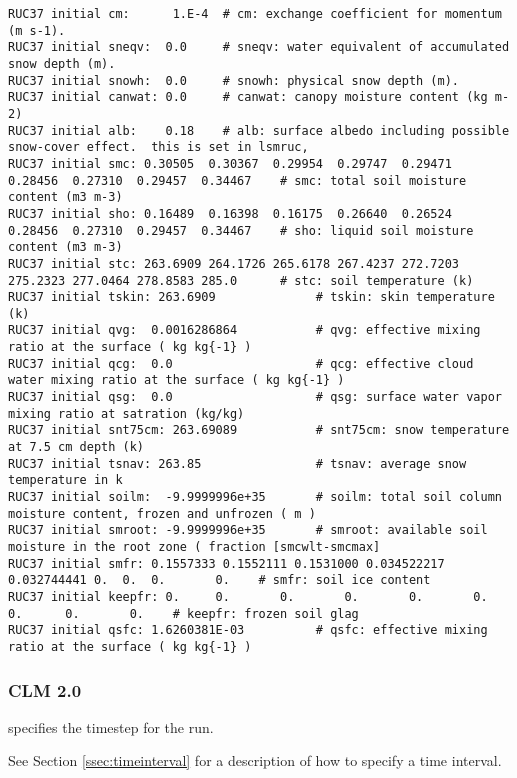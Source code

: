 \begin{Verbatim}[frame=single]
RUC37 initial cm:      1.E-4  # cm: exchange coefficient for momentum (m s-1).
RUC37 initial sneqv:  0.0     # sneqv: water equivalent of accumulated snow depth (m).
RUC37 initial snowh:  0.0     # snowh: physical snow depth (m).
RUC37 initial canwat: 0.0     # canwat: canopy moisture content (kg m-2)
RUC37 initial alb:    0.18    # alb: surface albedo including possible snow-cover effect.  this is set in lsmruc,
RUC37 initial smc: 0.30505  0.30367  0.29954  0.29747  0.29471  0.28456  0.27310  0.29457  0.34467    # smc: total soil moisture content (m3 m-3)
RUC37 initial sho: 0.16489  0.16398  0.16175  0.26640  0.26524  0.28456  0.27310  0.29457  0.34467    # sho: liquid soil moisture content (m3 m-3)
RUC37 initial stc: 263.6909 264.1726 265.6178 267.4237 272.7203 275.2323 277.0464 278.8583 285.0      # stc: soil temperature (k)
RUC37 initial tskin: 263.6909              # tskin: skin temperature (k)
RUC37 initial qvg:  0.0016286864           # qvg: effective mixing ratio at the surface ( kg kg{-1} )
RUC37 initial qcg:  0.0                    # qcg: effective cloud water mixing ratio at the surface ( kg kg{-1} )
RUC37 initial qsg:  0.0                    # qsg: surface water vapor mixing ratio at satration (kg/kg)
RUC37 initial snt75cm: 263.69089           # snt75cm: snow temperature at 7.5 cm depth (k)
RUC37 initial tsnav: 263.85                # tsnav: average snow temperature in k
RUC37 initial soilm:  -9.9999996e+35       # soilm: total soil column moisture content, frozen and unfrozen ( m )
RUC37 initial smroot: -9.9999996e+35       # smroot: available soil moisture in the root zone ( fraction [smcwlt-smcmax]
RUC37 initial smfr: 0.1557333 0.1552111 0.1531000 0.034522217 0.032744441 0.  0.  0.       0.    # smfr: soil ice content 
RUC37 initial keepfr: 0.     0.       0.       0.       0.       0.       0.      0.       0.    # keepfr: frozen soil glag
RUC37 initial qsfc: 1.6260381E-03          # qsfc: effective mixing ratio at the surface ( kg kg{-1} )
 \end{Verbatim}
 



 
 \subsubsection{CLM 2.0} \label{sssec:lsm_clm2}
 

 
  specifies the timestep for the run.

 See Section \ref{ssec:timeinterval} for a description
 of how to specify a time interval.

